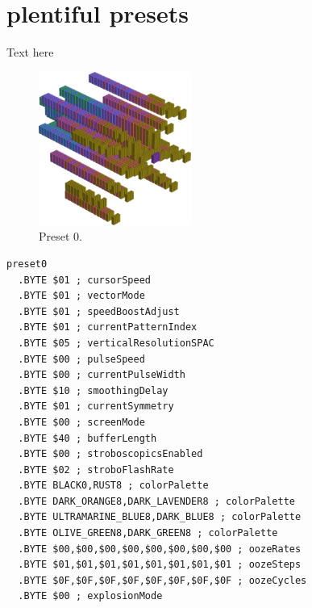 \chapter{plentiful presets} 
\label{sec:presets}
\lstset{style=6502Style}
Text here
\clearpage
\begin{minipage}[b]{0.48\linewidth}
\begin{figure}[H]                                                          
  \centering                                                             
  \begin{adjustbox}{width=5cm,center}                                   
  \includegraphics[width=5cm]{src/colorspace_presets/preset0-45.png}%
  \end{adjustbox}                                                        
\caption*{Preset 0.}                                           
\end{figure}                                                               
\end{minipage}
\hspace{0.1cm}
\begin{minipage}[b]{0.48\linewidth}                            
\begin{lstlisting}[basicstyle=\ttfamily\tiny]
preset0
  .BYTE $01 ; cursorSpeed
  .BYTE $01 ; vectorMode
  .BYTE $01 ; speedBoostAdjust
  .BYTE $01 ; currentPatternIndex
  .BYTE $05 ; verticalResolutionSPAC
  .BYTE $00 ; pulseSpeed
  .BYTE $00 ; currentPulseWidth
  .BYTE $10 ; smoothingDelay
  .BYTE $01 ; currentSymmetry
  .BYTE $00 ; screenMode
  .BYTE $40 ; bufferLength
  .BYTE $00 ; stroboscopicsEnabled
  .BYTE $02 ; stroboFlashRate
  .BYTE BLACK0,RUST8 ; colorPalette
  .BYTE DARK_ORANGE8,DARK_LAVENDER8 ; colorPalette
  .BYTE ULTRAMARINE_BLUE8,DARK_BLUE8 ; colorPalette
  .BYTE OLIVE_GREEN8,DARK_GREEN8 ; colorPalette
  .BYTE $00,$00,$00,$00,$00,$00,$00,$00 ; oozeRates
  .BYTE $01,$01,$01,$01,$01,$01,$01,$01 ; oozeSteps
  .BYTE $0F,$0F,$0F,$0F,$0F,$0F,$0F,$0F ; oozeCycles
  .BYTE $00 ; explosionMode
\end{lstlisting}
\end{minipage}

